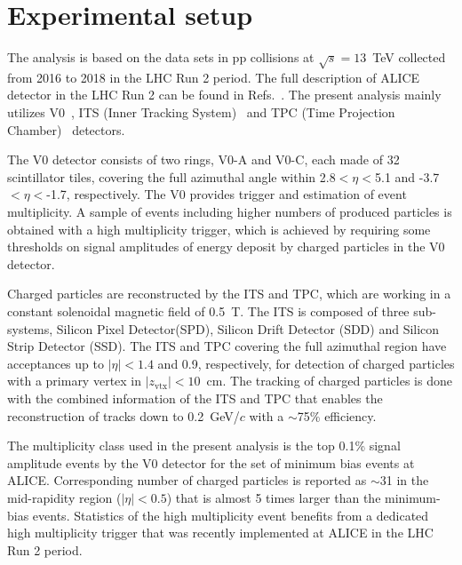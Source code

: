 
\section{Experimental setup}
\label{sec:experiment}

The analysis is based on the data sets in pp collisions at $\sqrt{s} = 13$~TeV collected from 2016 to 2018 in the LHC Run 2 period.  The full description of ALICE detector in the LHC Run 2 can be found in Refs.~\cite{Aamodt:2008zz,Abelev:2014ffa}. The present analysis mainly utilizes V0~\cite{Abbas:2013taa}, ITS (Inner Tracking System)~\cite{aliceITS} and TPC (Time Projection Chamber)~\cite{aliceTPC} detectors.


The V0 detector consists of two rings, V0-A and V0-C, each made of 32 scintillator tiles, covering the full azimuthal angle within 2.8$<\eta<$5.1 and -3.7$<\eta<$-1.7, respectively. The V0 provides trigger and estimation of event multiplicity. A sample of events including higher numbers of produced particles is obtained with a high multiplicity trigger, which is achieved by requiring some thresholds on signal amplitudes of energy deposit by charged particles in the V0 detector.

Charged particles are reconstructed by the ITS and TPC, which are working in a constant solenoidal magnetic field of 0.5~T.  The ITS is composed of three sub-systems, Silicon Pixel Detector(SPD), Silicon Drift Detector (SDD) and Silicon Strip Detector (SSD). The ITS and TPC covering the full azimuthal region have acceptances up to $|\eta| < 1.4$ and 0.9, respectively, for detection of charged particles with a primary vertex in $|z_\mathrm{vtx}|<10$~cm. The tracking of charged particles is done with the combined information of the ITS and TPC that enables the reconstruction of tracks down to 0.2~GeV/$c$ with a $\sim $75\% efficiency.


The multiplicity class used in the present analysis is the top 0.1\% signal amplitude events by the V0 detector for the set of minimum bias events at ALICE. Corresponding number of charged particles is reported as $\sim$31 in the mid-rapidity region ($|\eta|<0.5$) that is almost 5 times larger than the minimum-bias events.  Statistics of the high multiplicity event benefits from a dedicated high multiplicity trigger that was recently implemented at ALICE  in the LHC Run 2 period.  
 


